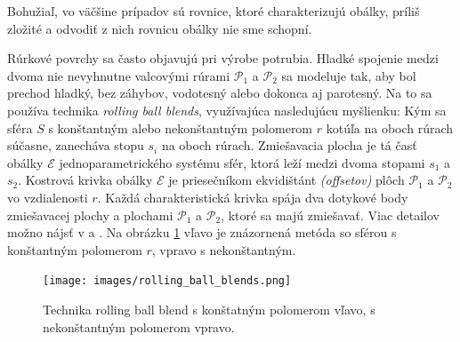 Bohužiaľ, vo väčšine prípadov sú rovnice, ktoré charakterizujú obálky, príliš zložité a odvodiť z nich rovnicu obálky nie sme schopní.

Rúrkové povrchy sa často objavujú pri výrobe potrubia. Hladké spojenie medzi dvoma nie nevyhnutne valcovými rúrami $\mathcal{P}_1$ a $\mathcal{P}_2$ sa modeluje tak, aby bol prechod hladký, bez záhybov, vodotesný alebo dokonca aj parotesný. Na to sa používa technika \textit{rolling ball blends}, využívajúca nasledujúcu myšlienku: Kým sa sféra $S$ s konštantným alebo nekonštantným polomerom $r$ kotúľa na oboch rúrach súčasne, zanecháva stopu $s_i$ na oboch rúrach. Zmiešavacia plocha je tá časť obálky $\mathcal{E}$ jednoparametrického systému sfér, ktorá leží medzi dvoma stopami $s_1$ a $s_2$. Kostrová krivka obálky $\mathcal{E}$ je priesečníkom ekvidištánt \textit{(offsetov)} plôch $\mathcal{P}_1$ a $\mathcal{P}_2$ vo vzdialenosti $r$. Každá charakteristická krivka spája dva dotykové body zmiešavacej plochy a plochami $\mathcal{P}_1$ a $\mathcal{P}_2$, ktoré sa majú zmiešavať. Viac detailov možno nájsť v \cite{Kar00} a \cite{Ode20}. Na obrázku \ref{fig:rolling_ball_blends} vľavo je znázornená metóda so sférou s konštantným polomerom $r$, vpravo s nekonštantným.

\begin{figure}[H]
	\centering
	\texttt{[image: images/rolling\_ball\_blends.png]}
	\caption[Technika rolling ball blends.]{Technika rolling ball blend s konštatným polomerom vľavo, s nekonštantným polomerom vpravo. \cite{Rollingballblends}}
	\label{fig:rolling_ball_blends}
\end{figure}